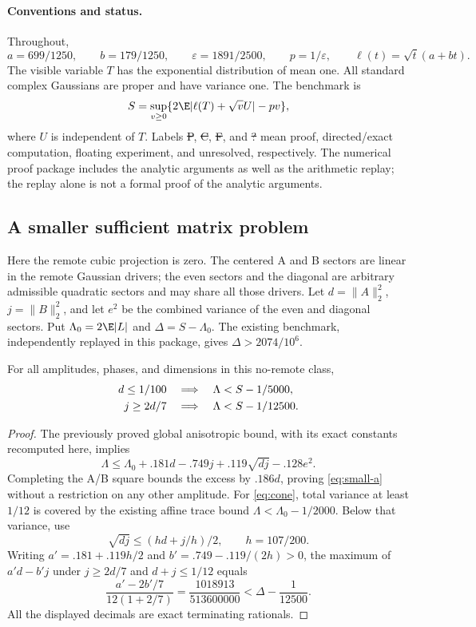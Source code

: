 \paragraph{Conventions and status.}
Throughout,
\[
 a=699/1250,\qquad b=179/1250,\qquad
 \varepsilon=1891/2500,\qquad p=1/\varepsilon,
 \qquad \ell(t)=\sqrt t(a+bt).
\]
The visible variable $T$ has the exponential distribution of mean one.
All standard complex Gaussians are proper and have variance one. The benchmark is
\[
 S=\sup_{v\ge0}\{2\E|\ell(T)+\sqrt v U|-pv\},
\]
where $U$ is independent of $T$. Labels \st{P}, \st{C}, \st{F}, and \st{?}
mean proof, directed/exact computation, floating experiment, and unresolved,
respectively. The numerical proof package includes the analytic arguments as
well as the arithmetic replay; the replay alone is not a formal proof of the
analytic arguments.



\subsection{A smaller sufficient matrix problem}
\label{sec:hybrid-matrix}
Here the remote cubic projection is zero. The centered A and B sectors are
linear in the remote Gaussian drivers; the even sectors and the diagonal
are arbitrary admissible quadratic sectors and may share all those drivers.
Let $d=\|A\|_2^2$, $j=\|B\|_2^2$, and let $e^2$ be the combined variance of
the even and diagonal sectors. Put $\Lambda_0=2\E|L|$ and
$\Delta=S-\Lambda_0$. The existing benchmark, independently replayed in
this package, gives $\Delta>2074/10^6$.

\begin{proposition}
For all amplitudes, phases, and dimensions in this no-remote class,
\begin{align}
 d\le1/100&\quad\Longrightarrow\quad
       \Lambda<S-1/5000,\label{eq:small-a}\relax\\
 j\ge2d/7&\quad\Longrightarrow\quad
       \Lambda<S-1/12500.\label{eq:cone}
\end{align}
\end{proposition}
\begin{proof}
The previously proved global anisotropic bound, with its exact constants
recomputed here, implies
\[
 \Lambda\le\Lambda_0+.181d-.749j+.119\sqrt{dj}-.128e^2.
 \tag{H1}
\]
Completing the A/B square bounds the excess by $.186d$, proving
\eqref{eq:small-a} without a restriction on any other amplitude.
For \eqref{eq:cone}, total variance at least $1/12$ is covered by the
existing affine trace bound $\Lambda<\Lambda_0-1/2000$.
Below that variance, use
\[
 \sqrt{dj}\le(hd+j/h)/2,\qquad h=107/200.
\]
Writing $a'=.181+.119h/2$ and $b'=.749-.119/(2h)>0$, the maximum
of $a'd-b'j$ under $j\ge2d/7$ and $d+j\le1/12$ equals
\[
 \frac{a'-2b'/7}{12(1+2/7)}
 =\frac{1018913}{513600000}<\Delta-\frac1{12500}.
\]
All the displayed decimals are exact terminating rationals.
\end{proof}

